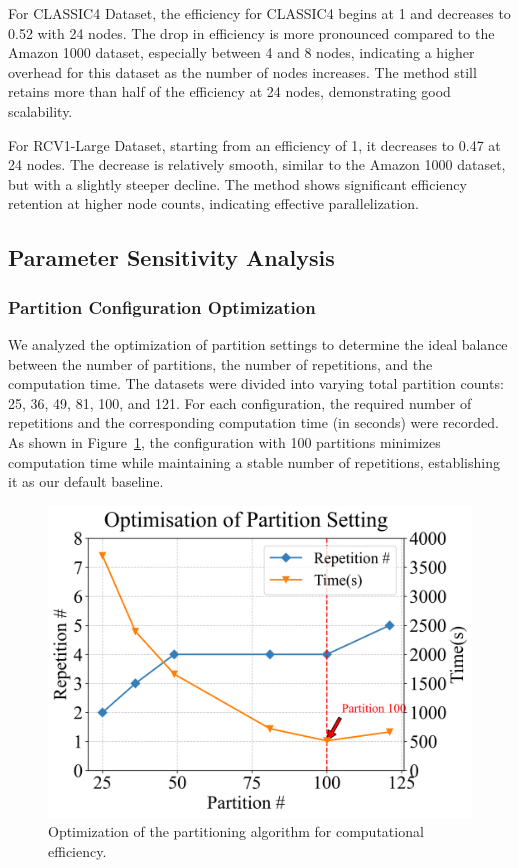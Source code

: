 \documentclass[journal]{IEEEtran}
\begin{document}
For CLASSIC4 Dataset, the efficiency for CLASSIC4 begins at 1 and decreases to 0.52 with 24 nodes. The drop in efficiency is more pronounced compared to the Amazon 1000 dataset, especially between 4 and 8 nodes, indicating a higher overhead for this dataset as the number of nodes increases. The method still retains more than half of the efficiency at 24 nodes, demonstrating good scalability.

For RCV1-Large Dataset, starting from an efficiency of 1, it decreases to 0.47 at 24 nodes. The decrease is relatively smooth, similar to the Amazon 1000 dataset, but with a slightly steeper decline. The method shows significant efficiency retention at higher node counts, indicating effective parallelization.

    {\color{blue}
        \subsection{Parameter Sensitivity Analysis}

        \subsubsection{Partition Configuration Optimization}
        We analyzed the optimization of partition settings to determine the ideal balance between the number of partitions, the number of repetitions, and the computation time. The datasets were divided into varying total partition counts: 25, 36, 49, 81, 100, and 121. For each configuration, the required number of repetitions and the corresponding computation time (in seconds) were recorded. As shown in Figure~\ref{fig:optimisation}, the configuration with 100 partitions minimizes computation time while maintaining a stable number of repetitions, establishing it as our default baseline.

        \begin{figure}[htbp]
            \centering
            \includegraphics[width=0.8\linewidth]{optimisation.png}
            \caption{Optimization of the partitioning algorithm for computational efficiency.}
            \label{fig:optimisation}
        \end{figure}

}
\end{document}
